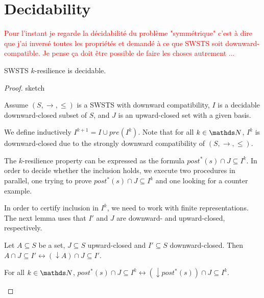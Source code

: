 
\section{Decidability}

\textcolor{red}{Pour l'instant je regarde la décidabilité du problème "symmétrique" c'est à dire que j'ai inversé toutes les propriétés et demandé à ce que SWSTS soit downward-compatible. Je pense ça doit être possible de faire les choses autrement ...}

\begin{theorem}
{\sc SWSTS $k$-resilience} is decidable.
\end{theorem}

\begin{proof}{sketch}

Assume  $(S, \rightarrow, \leq)$ is a SWSTS with downward compatibility, $I$ is a decidable downward-closed subset of $S$, and $J$ is an upward-closed set with a given basis.

We define inductively
$I^{k+1} = I \cup pre(I^k )$. Note that for all $k \in \N$, $I^k$ is downward-closed due to
the strongly downward compatibility of $(S, \rightarrow, \leq)$.


The $k$-resilience property can be expressed as the formula
$ post^*(s) \cap J \subseteq I^k$. In order to decide whether the inclusion holds, we execute two procedures in parallel, one trying to prove $ post^*(s)\cap J \subseteq I^k$ 
and one looking for a counter example.

In order to certify inclusion in $I^k$, we need to work with finite representations.
The next lemma uses that $I'$ and $J$ are downward- and upward-closed, respectively.

\begin{lemma}
Let $A \subseteq S$ be a set, $J \subseteq S$ upward-closed and $I' \subseteq S$ downward-closed. 
Then $A \cap J \subseteq I' \leftrightarrow (\downarrow  A) \cap J \subseteq I'$.
\end{lemma}


\begin{corollary}
For all $k \in \N$,
$ post^*(s)\cap J \subseteq I^k \leftrightarrow (\downarrow  post^*(s)) \cap J \subseteq I^k$. 
\end{corollary}


\end{proof}
